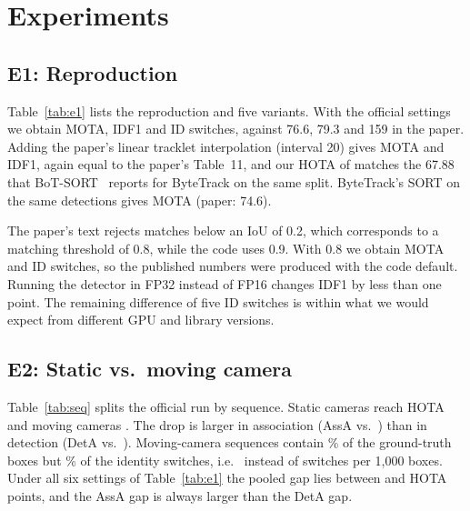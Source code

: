 \documentclass[conference]{IEEEtran}
\begin{document}
\section{Experiments}

\subsection{E1: Reproduction}\label{sec:e1}
Table~\ref{tab:e1} lists the reproduction and five variants. With the official settings we obtain \vEoneMOTA{} MOTA,
\vEoneIDF{} IDF1 and \vEoneIDs{} ID switches, against 76.6, 79.3 and 159 in the paper. Adding the paper's linear
tracklet interpolation (interval 20) gives \vInterpMOTA{} MOTA and \vInterpIDF{} IDF1, again equal to the paper's
Table~11, and our HOTA of \vEoneHOTA{} matches the 67.88 that BoT-SORT~\cite{aharon2022botsort} reports for ByteTrack on
the same split. ByteTrack's SORT on the same detections gives \vSortMOTA{} MOTA (paper: 74.6).

The paper's text rejects matches below an IoU of 0.2, which corresponds to a matching threshold of 0.8, while the code
uses 0.9. With 0.8 we obtain \vMatchEightMOTA{} MOTA and \vMatchEightIDs{} ID switches, so the published numbers were
produced with the code default. Running the detector in FP32 instead of FP16 changes IDF1 by less than one point.
The remaining difference of five ID switches is within what we would expect from different GPU and library versions.

\begin{table}[t]
\centering
\caption{E1: reproduction on MOT17 half-val ($^*$: ByteTrack's own evaluation).}
\label{tab:e1}
\footnotesize
\setlength{\tabcolsep}{3.5pt}

\end{table}

\subsection{E2: Static vs.\ moving camera}\label{sec:e2}
Table~\ref{tab:seq} splits the official run by sequence. Static cameras reach \vStaticHOTA{} HOTA and moving cameras
\vMovingHOTA. The drop is larger in association (AssA \vStaticAssA{} vs.\ \vMovingAssA) than in detection
(DetA \vStaticDetA{} vs.\ \vMovingDetA). Moving-camera sequences contain \vMovingShareGT\% of the ground-truth boxes but
\vMovingShareIDSW\% of the identity switches, i.e.\ \vMovingIDSWk{} instead of \vStaticIDSWk{} switches per 1{,}000
boxes. Under all six settings of Table~\ref{tab:e1} the pooled gap lies between \vGapMin{} and \vGapMax{} HOTA
points, and the AssA gap is always larger than the DetA gap.
\end{document}
